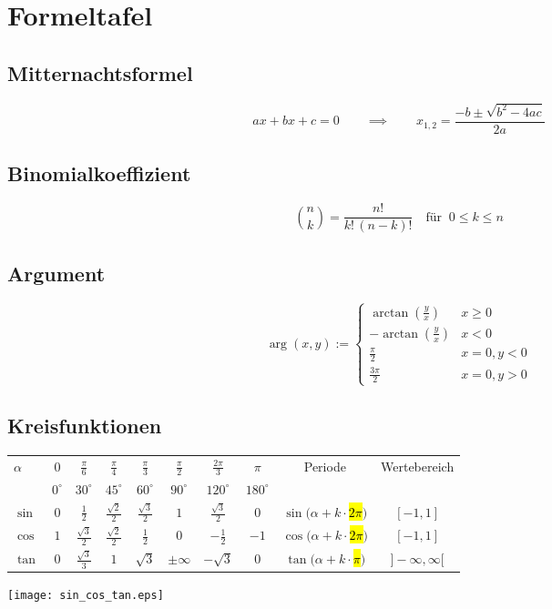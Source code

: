 \section{Formeltafel}
\subsection{Mitternachtsformel}
\[ a x + b x + c = 0 \qquad \implies \qquad x_{1,2} = \frac{-b \pm \sqrt{b^2-4ac}}{2a} \]

\subsection{Binomialkoeffizient}
\[ \binom nk = \frac{n!}{k!\,(n-k)!} \quad \mbox{für }\ 0\leq k\leq n \]

\subsection{Argument}
\[
	\arg(x,y) := \begin{cases}
		\arctan(\frac{y}{x}) & x \geq 0 \\
		-\arctan(\frac{y}{x}) & x < 0 \\
		\frac{\pi}{2} & x=0, y < 0 \\
		\frac{3\pi}{2} & x = 0, y > 0
	\end{cases}
\]

\subsection{Kreisfunktionen}
{\footnotesize
\begin{tabular}{|l||c|c|c|c|c|c|c||c|c|}\hline
\multirow{2}{*}{$\alpha$} & $0$ & $\frac{\pi}{6}$ & $\frac{\pi}{4}$ &
$\frac{\pi}{3}$ & $\frac{\pi}{2}$ & $\frac{2\pi}{3}$ & $\pi$ &
\multirow{2}{*}{Periode} & \multirow{2}{*}{Wertebereich}\\

& $0^\circ$ & $30^\circ$ & $45^\circ$ & $60^\circ$ & $90^\circ$ & $120^\circ$ &
$180^\circ$ & &\\ \hline

$\sin$ & $0$ & $\frac{1}{2}$ & $\frac{\sqrt{2}}{2}$ &
$\frac{\sqrt{3}}{2}$ & $1$ & $\frac{\sqrt{3}}{2}$ & $0$ & $\sin(\alpha +
k\cdot$\hl{$2\pi$}$)$ & $[-1,1]$\\ \hline

$\cos$ & $1$ & $\frac{\sqrt{3}}{2}$ & $\frac{\sqrt{2}}{2}$ & $\frac{1}{2}$ & $0$
& $-\frac{1}{2}$ & $-1$ & $\cos(\alpha + k\cdot$\hl{$2\pi$}$)$ & $[-1,1]$\\
\hline


$\tan$ & $0$ & $\frac{\sqrt{3}}{3}$ & $1$ & $\sqrt{3}$ & $\pm \infty$ &
$-\sqrt{3}$ & $0$ & $\tan(\alpha + k \cdot$\hl{$\pi$}$)$ & $]-\infty, \infty[$
\\
\hline
\end{tabular}
}
\texttt{[image: sin\_cos\_tan.eps]}

